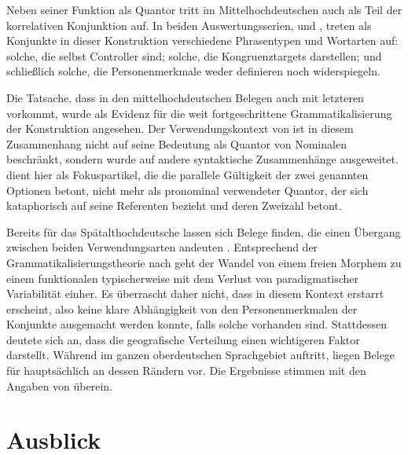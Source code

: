 Neben seiner Funktion als Quantor tritt  im Mittelhochdeutschen
auch als Teil der korrelativen Konjunktion 
 auf. In beiden Auswertungs\-serien,
 und \citet{kc}, treten als Konjunkte in dieser Konstruktion
verschiedene Phrasen\-typen und Wort\-arten auf: solche, die selbst Controller
sind; solche, die Kongruenztargets darstellen; und schließlich solche, die
Personenmerkmale weder definieren noch widerspiegeln.

Die Tatsache, dass  in den mittelhochdeutschen Belegen auch mit
letzteren vorkommt, wurde als Evidenz für die weit fortgeschrittene
Grammatikalisierung der Konstruktion angesehen. Der Verwendungskontext von
 ist in diesem Zusammenhang nicht auf seine Bedeutung als Quantor
von Nominalen beschränkt, sondern wurde auf andere syntaktische Zusammenhänge
ausgeweitet.  dient hier als Fokuspartikel, die die parallele
Gültigkeit der zwei genannten Optionen betont, nicht mehr als pronominal
verwendeter Quantor, der sich kataphorisch auf seine Referenten bezieht und
deren Zweizahl betont.

Bereits für das Spätalthochdeutsche lassen sich Belege finden, die einen
Übergang zwischen beiden Verwendungsarten andeuten \autocite[vgl.\ die
Beispiele in][627]{ksw2}. Entsprechend der Grammatikalisierungstheorie nach
\citet[146--150]{lehmann2015} geht der Wandel von einem freien Morphem zu einem
funktionalen typischerweise mit dem Verlust von paradigmatischer Variabilität
einher. Es überrascht daher nicht, dass  in diesem Kontext
erstarrt erscheint, also keine klare Abhängigkeit von den Personenmerkmalen der
Konjunkte ausgemacht werden konnte, falls solche vorhanden sind. Stattdessen
deutete sich an, dass die geografische Verteilung einen wichtigeren Faktor
darstellt. Während  im ganzen oberdeutschen Sprachgebiet auftritt,
liegen Belege für  hauptsächlich an dessen Rändern vor. Die
Ergebnisse stimmen mit den Angaben von \citet[627--628]{ksw2} überein.

\section{Ausblick}

